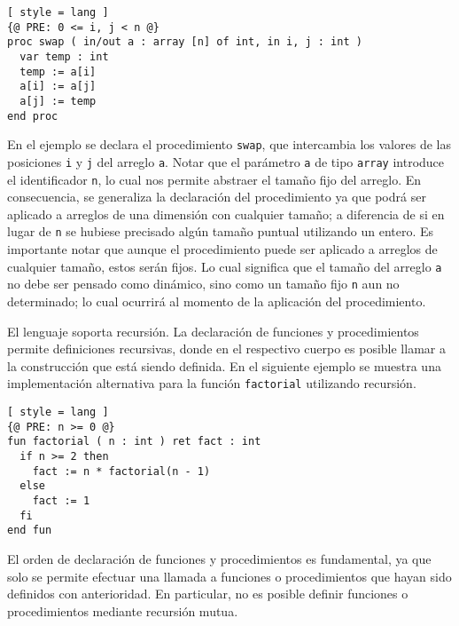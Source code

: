 \begin{lstlisting}[ style = lang ]
{@ PRE: 0 <= i, j < n @}
proc swap ( in/out a : array [n] of int, in i, j : int )
  var temp : int
  temp := a[i]
  a[i] := a[j]
  a[j] := temp
end proc
\end{lstlisting}

En el ejemplo se declara el procedimiento \lstinline[style = lang]{swap}, que intercambia los valores de las posiciones \lstinline[style = lang]{i} y \lstinline[style = lang]{j} del arreglo \lstinline[style = lang]{a}.
Notar que el parámetro \lstinline[style = lang]{a} de tipo \lstinline[style = lang]{array} introduce el identificador \lstinline[style = lang]{n}, lo cual nos permite abstraer el tamaño fijo del arreglo.
En consecuencia, se generaliza la declaración del procedimiento ya que podrá ser aplicado a arreglos de una dimensión con cualquier tamaño; a diferencia de si en lugar de \lstinline[style = lang]{n} se hubiese precisado algún tamaño puntual utilizando un entero.
Es importante notar que aunque el procedimiento puede ser aplicado a arreglos de cualquier tamaño, estos serán fijos.
Lo cual significa que el tamaño del arreglo \lstinline[style = lang]{a} no debe ser pensado como dinámico, sino como un tamaño fijo \lstinline[style = lang]{n} aun no determinado; lo cual ocurrirá al momento de la aplicación del procedimiento.

El lenguaje soporta recursión.
La declaración de funciones y procedimientos permite definiciones recursivas, donde en el respectivo cuerpo es posible llamar a la construcción que está siendo definida.
En el siguiente ejemplo se muestra una implementación alternativa para la función \lstinline[style = lang]{factorial} utilizando recursión.

\begin{lstlisting}[ style = lang ]
{@ PRE: n >= 0 @}
fun factorial ( n : int ) ret fact : int
  if n >= 2 then
    fact := n * factorial(n - 1)
  else
    fact := 1
  fi
end fun
\end{lstlisting}

El orden de declaración de funciones y procedimientos es fundamental, ya que solo se permite efectuar una llamada a funciones o procedimientos que hayan sido definidos con anterioridad.
En particular, no es posible definir funciones o procedimientos mediante recursión mutua.

